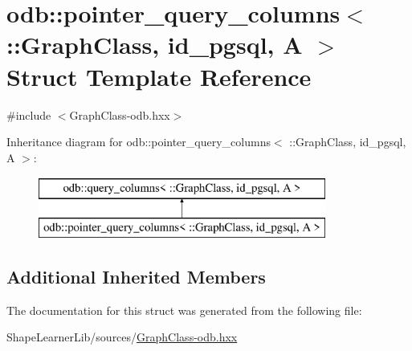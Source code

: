 \hypertarget{structodb_1_1pointer__query__columns_3_01_1_1_graph_class_00_01id__pgsql_00_01_a_01_4}{}\section{odb\+:\+:pointer\+\_\+query\+\_\+columns$<$ \+:\+:Graph\+Class, id\+\_\+pgsql, A $>$ Struct Template Reference}
\label{structodb_1_1pointer__query__columns_3_01_1_1_graph_class_00_01id__pgsql_00_01_a_01_4}


{\ttfamily \#include $<$Graph\+Class-\/odb.\+hxx$>$}

Inheritance diagram for odb\+:\+:pointer\+\_\+query\+\_\+columns$<$ \+:\+:Graph\+Class, id\+\_\+pgsql, A $>$\+:\begin{figure}[H]
\begin{center}
\leavevmode
\includegraphics[height=2.000000cm]{d9/dad/structodb_1_1pointer__query__columns_3_01_1_1_graph_class_00_01id__pgsql_00_01_a_01_4}
\end{center}
\end{figure}
\subsection*{Additional Inherited Members}


The documentation for this struct was generated from the following file\+:\begin{DoxyCompactItemize}
\item 
Shape\+Learner\+Lib/sources/\hyperlink{_graph_class-odb_8hxx}{Graph\+Class-\/odb.\+hxx}\end{DoxyCompactItemize}
